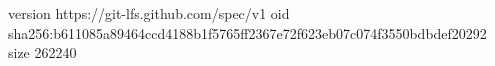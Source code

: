 version https://git-lfs.github.com/spec/v1
oid sha256:b611085a89464ccd4188b1f5765ff2367e72f623eb07c074f3550bdbdef20292
size 262240
